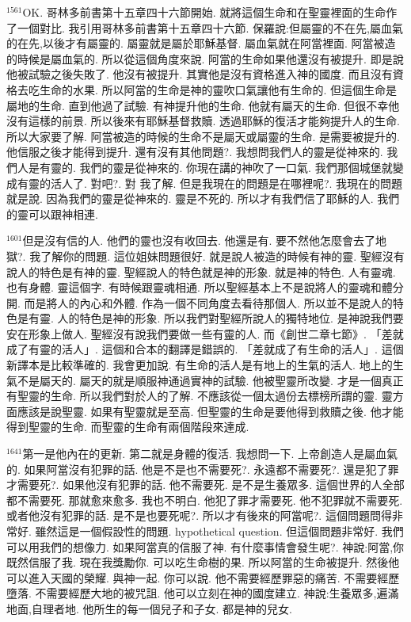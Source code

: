 \documentclass{book}
\begin{document}
$^{1561}$OK.
哥林多前書第十五章四十六節開始.
就將這個生命和在聖靈裡面的生命作了一個對比.
我引用哥林多前書第十五章四十六節.
保羅說:但屬靈的不在先,屬血氣的在先,以後才有屬靈的.
屬靈就是屬於耶穌基督.
屬血氣就在阿當裡面.
阿當被造的時候是屬血氣的.
所以從這個角度來說.
阿當的生命如果他還沒有被提升.
即是說他被試驗之後失敗了.
他沒有被提升.
其實他是沒有資格進入神的國度.
而且沒有資格去吃生命的水果.
所以阿當的生命是神的靈吹口氣讓他有生命的.
但這個生命是屬地的生命.
直到他過了試驗.
有神提升他的生命.
他就有屬天的生命.
但很不幸他沒有這樣的前景.
所以後來有耶穌基督救贖.
透過耶穌的復活才能夠提升人的生命.
所以大家要了解.
阿當被造的時候的生命不是屬天或屬靈的生命.
是需要被提升的.
他信服之後才能得到提升.
還有沒有其他問題?.
我想問我們人的靈是從神來的.
我們人是有靈的.
我們的靈是從神來的.
你現在講的神吹了一口氣.
我們那個城堡就變成有靈的活人了.
對吧?.
對 我了解.
但是我現在的問題是在哪裡呢?.
我現在的問題就是說.
因為我們的靈是從神來的.
靈是不死的.
所以才有我們信了耶穌的人.
我們的靈可以跟神相連.

$^{1601}$但是沒有信的人.
他們的靈也沒有收回去.
他還是有.
要不然他怎麼會去了地獄?.
我了解你的問題.
這位姐妹問題很好.
就是說人被造的時候有神的靈.
聖經沒有說人的特色是有神的靈.
聖經說人的特色就是神的形象.
就是神的特色.
人有靈魂.
也有身體.
靈這個字.
有時候跟靈魂相通.
所以聖經基本上不是說將人的靈魂和體分開.
而是將人的內心和外體.
作為一個不同角度去看待那個人.
所以並不是說人的特色是有靈.
人的特色是神的形象.
所以我們對聖經所說人的獨特地位.
是神說我們要安在形象上做人.
聖經沒有說我們要做一些有靈的人.
而《創世二章七節》.
「差就成了有靈的活人」.
這個和合本的翻譯是錯誤的.
「差就成了有生命的活人」.
這個新譯本是比較準確的.
我會更加說.
有生命的活人是有地上的生氣的活人.
地上的生氣不是屬天的.
屬天的就是順服神通過實神的試驗.
他被聖靈所改變.
才是一個真正有聖靈的生命.
所以我們對於人的了解.
不應該從一個太過份去標榜所謂的靈.
靈方面應該是說聖靈.
如果有聖靈就是至高.
但聖靈的生命是要他得到救贖之後.
他才能得到聖靈的生命.
而聖靈的生命有兩個階段來達成.

$^{1641}$第一是他內在的更新.
第二就是身體的復活.
我想問一下.
上帝創造人是屬血氣的.
如果阿當沒有犯罪的話.
他是不是也不需要死?.
永遠都不需要死?.
還是犯了罪才需要死?.
如果他沒有犯罪的話.
他不需要死.
是不是生養眾多.
這個世界的人全部都不需要死.
那就愈來愈多.
我也不明白.
他犯了罪才需要死.
他不犯罪就不需要死.
或者他沒有犯罪的話.
是不是也要死呢?.
所以才有後來的阿當呢?.
這個問題問得非常好.
雖然這是一個假設性的問題.
hypothetical question.
但這個問題非常好.
我們可以用我們的想像力.
如果阿當真的信服了神.
有什麼事情會發生呢?.
神說:阿當,你既然信服了我.
現在我獎勵你.
可以吃生命樹的果.
所以阿當的生命被提升.
然後他可以進入天國的榮耀.
與神一起.
你可以說.
他不需要經歷罪惡的痛苦.
不需要經歷墮落.
不需要經歷大地的被咒詛.
他可以立刻在神的國度建立.
神說:生養眾多,遍滿地面,自理者地.
他所生的每一個兒子和子女.
都是神的兒女.
\end{document}
